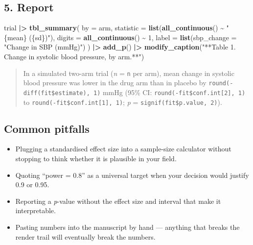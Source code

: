 \documentclass[
]{article}
\newenvironment{Shaded}{\begin{snugshade}}{\end{snugshade}}
\newcommand{\AttributeTok}[1]{\textcolor[rgb]{0.13,0.29,0.53}{#1}}
\newcommand{\DecValTok}[1]{\textcolor[rgb]{0.00,0.00,0.81}{#1}}
\newcommand{\FunctionTok}[1]{\textcolor[rgb]{0.13,0.29,0.53}{\textbf{#1}}}
\newcommand{\NormalTok}[1]{#1}
\newcommand{\SpecialCharTok}[1]{\textcolor[rgb]{0.81,0.36,0.00}{\textbf{#1}}}
\newcommand{\StringTok}[1]{\textcolor[rgb]{0.31,0.60,0.02}{#1}}
\providecommand{\tightlist}{%
  \setlength{\itemsep}{0pt}\setlength{\parskip}{0pt}}
\begin{document}
\subsection{5. Report}\label{report}

\begin{Shaded}
\begin{Highlighting}[]
\NormalTok{trial }\SpecialCharTok{|\textgreater{}}
  \FunctionTok{tbl\_summary}\NormalTok{(}
    \AttributeTok{by =}\NormalTok{ arm,}
    \AttributeTok{statistic =} \FunctionTok{list}\NormalTok{(}\FunctionTok{all\_continuous}\NormalTok{() }\SpecialCharTok{\textasciitilde{}} \StringTok{"\{mean\} (\{sd\})"}\NormalTok{),}
    \AttributeTok{digits    =} \FunctionTok{all\_continuous}\NormalTok{() }\SpecialCharTok{\textasciitilde{}} \DecValTok{1}\NormalTok{,}
    \AttributeTok{label     =} \FunctionTok{list}\NormalTok{(}\AttributeTok{sbp\_change =} \StringTok{"Change in SBP (mmHg)"}\NormalTok{)}
\NormalTok{  ) }\SpecialCharTok{|\textgreater{}}
  \FunctionTok{add\_p}\NormalTok{() }\SpecialCharTok{|\textgreater{}}
  \FunctionTok{modify\_caption}\NormalTok{(}\StringTok{"**Table 1. Change in systolic blood pressure, by arm.**"}\NormalTok{)}
\end{Highlighting}
\end{Shaded}

\begin{quote}
In a simulated two-arm trial (\emph{n} = \texttt{n} per arm), mean
change in systolic blood pressure was lower in the drug arm than in
placebo by \texttt{round(-diff(fit\$estimate),\ 1)} mmHg (95\% CI:
\texttt{round(-fit\$conf.int{[}2{]},\ 1)} to
\texttt{round(-fit\$conf.int{[}1{]},\ 1)}; \emph{p} =
\texttt{signif(fit\$p.value,\ 2)}).
\end{quote}

\subsection{Common pitfalls}\label{common-pitfalls}

\begin{itemize}
\tightlist
\item
  Plugging a standardised effect size into a sample-size calculator
  without stopping to think whether it is plausible in your field.
\item
  Quoting ``power = 0.8'' as a universal target when your decision would
  justify 0.9 or 0.95.
\item
  Reporting a \emph{p}-value without the effect size and interval that
  make it interpretable.
\item
  Pasting numbers into the manuscript by hand --- anything that breaks
  the render trail will eventually break the numbers.
\end{itemize}
\end{document}
